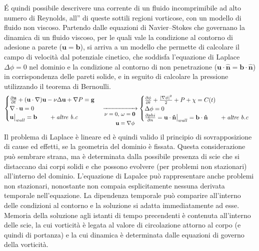 \documentclass[letterpaper,10pt,italian]{jupyterBook}
\begin{document}
\sphinxAtStartPar
É quindi possibile descrivere una corrente di un fluido incomprimibile
ad alto numero di Reynolds, all” di queste sottili regioni
vorticose, con un modello di fluido non viscoso. Partendo dalle
equazioni di Navier–Stokes che governano la dinamica di un fluido
viscoso, per le quali vale la condizione al contorno di adesione a
parete (\(\mathbf{u} = \mathbf{b}\)), si arriva a un modello che permette di
calcolare il campo di velocità dal potenziale cinetico, che soddisfa
l’equazione di Laplace \(\Delta \phi = 0\) nel dominio e la condizione al
contorno di non penetrazione
(\(\mathbf{u} \cdot \mathbf{\hat{n}} = \mathbf{b} \cdot \mathbf{\hat{n}}\)) in
corrispondenza delle pareti solide, e in seguito di calcolare la
pressione utilizzando il teorema di Bernoulli.
\begin{equation*}
\begin{split}\begin{cases}
  \frac{\partial \mathbf{u}}{\partial t} + (\mathbf{u} \cdot \mathbf{\nabla}) \mathbf{u} - \nu \Delta \mathbf{u} + \mathbf{\nabla}P = \mathbf{g} \\
  \mathbf{\nabla} \cdot \mathbf{u} = 0 \\
  \mathbf{u}\big|_{wall} = \mathbf{b}  \qquad + \textit{altre b.c}
 \end{cases}
 \xrightarrow[{\small \begin{aligned} \nu = 0 , & \ \omega = \mathbf{0} \\ \mathbf{u} & = \mathbf{\nabla}\phi \end{aligned} }]{}
  \begin{cases}
  \frac{\partial \phi}{\partial t} + \frac{|\mathbf{\nabla}\phi|^2}{2} + P + \chi = C(t) \\
  \Delta \phi = 0 \\
  \frac{\partial phi}{\partial n} = \mathbf{u}\cdot\mathbf{\hat{n}} \big|_{wall} = \mathbf{b}\cdot\mathbf{\hat{n}} \qquad +  \textit{altre b.c} \\
 \end{cases}\end{split}
\end{equation*}
\sphinxAtStartPar
Il problema di Laplace è lineare ed è quindi valido il
principio di sovrapposizione di cause ed effetti, se la geometria del
dominio è fissata. Questa considerazione può sembrare strana, ma è
determinata dalla possibile presenza di scie che si distaccano dai corpi
solidi e che possono evolvere (per problemi non stazionari) all’interno
del dominio. L’equazione di Lapalce può rappresentare anche problemi non
stazionari, nonostante non compaia esplicitamente nessuna derivata
temporale nell’equazione. La dipendenza temporale può comparire
all’interno delle condizioni al contorno e la soluzione si adatta
immediatamente ad esse. Memoria della soluzione agli istanti di tempo
precendenti è contenuta all’interno delle scie, la cui vorticità è
legata al valore di circolazione attorno al corpo (e quindi di portanza)
e la cui dinamica è determinata dalle equazioni di governo della
vorticità.
\end{document}
